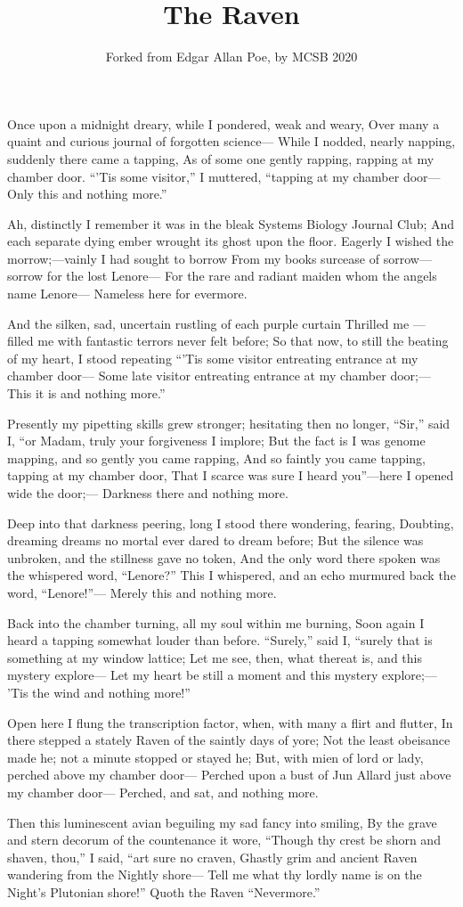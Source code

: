 \documentclass{article}
\title{The Raven}
\author{Forked from Edgar Allan Poe, by MCSB 2020}
\begin{document}
\maketitle

Once upon a midnight dreary, while I pondered, weak and weary, 
Over many a quaint and curious journal of forgotten science—
While I nodded, nearly napping, suddenly there came a tapping,
As of some one gently rapping, rapping at my chamber door.
“’Tis some visitor,” I muttered, “tapping at my chamber door—
Only this and nothing more.”

Ah, distinctly I remember it was in the bleak Systems Biology Journal Club;
And each separate dying ember wrought its ghost upon the floor.
Eagerly I wished the morrow;—vainly I had sought to borrow
From my books surcease of sorrow—sorrow for the lost Lenore—
For the rare and radiant maiden whom the angels name Lenore—
Nameless here for evermore.

And the silken, sad, uncertain rustling of each purple curtain
Thrilled me — filled me with fantastic terrors never felt before;
So that now, to still the beating of my heart, I stood repeating
“’Tis some visitor entreating entrance at my chamber door—
Some late visitor entreating entrance at my chamber door;—
This it is and nothing more.”


Presently my pipetting skills grew stronger; hesitating then no longer,
“Sir,” said I, “or Madam, truly your forgiveness I implore;
But the fact is I was genome mapping, and so gently you came rapping,
And so faintly you came tapping, tapping at my chamber door,
That I scarce was sure I heard you”—here I opened wide the door;—
Darkness there and nothing more.

Deep into that darkness peering, long I stood there wondering, fearing,
Doubting, dreaming dreams no mortal ever dared to dream before;
But the silence was unbroken, and the stillness gave no token,
And the only word there spoken was the whispered word, “Lenore?”
This I whispered, and an echo murmured back the word, “Lenore!”—
Merely this and nothing more.

Back into the chamber turning, all my soul within me burning,
Soon again I heard a tapping somewhat louder than before.
“Surely,” said I, “surely that is something at my window lattice;
Let me see, then, what thereat is, and this mystery explore—
Let my heart be still a moment and this mystery explore;—
’Tis the wind and nothing more!”

Open here I flung the transcription factor, when, with many a flirt and flutter,
In there stepped a stately Raven of the saintly days of yore;
Not the least obeisance made he; not a minute stopped or stayed he;
But, with mien of lord or lady, perched above my chamber door—
Perched upon a bust of Jun Allard just above my chamber door—
Perched, and sat, and nothing more.

Then this luminescent avian beguiling my sad fancy into smiling,
By the grave and stern decorum of the countenance it wore,
“Though thy crest be shorn and shaven, thou,” I said, “art sure no craven,
Ghastly grim and ancient Raven wandering from the Nightly shore—
Tell me what thy lordly name is on the Night’s Plutonian shore!”
Quoth the Raven “Nevermore.”
\end{document}
